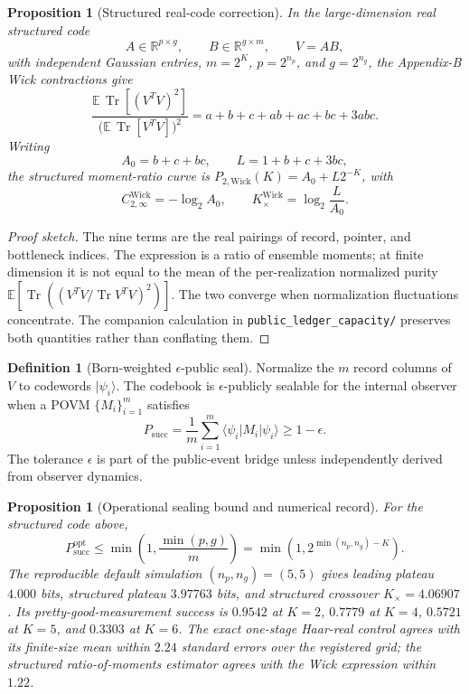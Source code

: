 \documentclass[11pt]{article}
\theoremstyle{plain}
\newtheorem{proposition}[theorem]{Proposition}
\theoremstyle{definition}
\newtheorem{definition}[theorem]{Definition}
\theoremstyle{remark}
\newenvironment{proofsketch}{\begin{proof}[Proof sketch]}{\end{proof}}
\newcommand{\R}{\mathbb{R}}
\newcommand{\Tr}{\operatorname{Tr}}
\begin{document}
\begin{proposition}[Structured real-code correction]
In the large-dimension real structured code
\[
A\in\R^{p\times g},
\qquad
B\in\R^{g\times m},
\qquad
V=AB,
\]
with independent Gaussian entries, \(m=2^K\), \(p=2^{n_p}\), and \(g=2^{n_g}\), the Appendix-B Wick contractions give
\[
\frac{\mathbb{E}\,\Tr[(V^TV)^2]}
{\bigl(\mathbb{E}\,\Tr[V^TV]\bigr)^2}
=a+b+c+ab+ac+bc+3abc.
\]
Writing
\[
A_0=b+c+bc,
\qquad
L=1+b+c+3bc,
\]
the structured moment-ratio curve is \(P_{2,\mathrm{Wick}}(K)=A_0+L2^{-K}\), with
\[
C_{2,\infty}^{\mathrm{Wick}}=-\log_2A_0,
\qquad
K_{\times}^{\mathrm{Wick}}=\log_2\frac{L}{A_0}.
\]
\end{proposition}

\begin{proofsketch}
The nine terms are the real pairings of record, pointer, and bottleneck indices. The expression is a ratio of ensemble moments; at finite dimension it is not equal to the mean of the per-realization normalized purity \(\mathbb{E}[\Tr((V^TV/\Tr V^TV)^2)]\). The two converge when normalization fluctuations concentrate. The companion calculation in \texttt{public\_ledger\_capacity/} preserves both quantities rather than conflating them.
\end{proofsketch}

\begin{definition}[Born-weighted \(\epsilon\)-public seal]
Normalize the \(m\) record columns of \(V\) to codewords \(\lvert\psi_i\rangle\). The codebook is \(\epsilon\)-publicly sealable for the internal observer when a POVM \(\{M_i\}_{i=1}^m\) satisfies
\[
P_{\mathrm{succ}}
=\frac1m\sum_{i=1}^m
\langle\psi_i\rvert M_i\lvert\psi_i\rangle
\ge 1-\epsilon.
\]
The tolerance \(\epsilon\) is part of the public-event bridge unless independently derived from observer dynamics.
\end{definition}

\begin{proposition}[Operational sealing bound and numerical record]
For the structured code above,
\[
P_{\mathrm{succ}}^{\mathrm{opt}}
\le
\min\!\left(1,\frac{\min(p,g)}{m}\right)
=
\min\!\left(1,2^{\min(n_p,n_g)-K}\right).
\]
The reproducible default simulation \((n_p,n_g)=(5,5)\) gives leading plateau \(4.000\) bits, structured plateau \(3.97763\) bits, and structured crossover \(K_\times=4.06907\). Its pretty-good-measurement success is \(0.9542\) at \(K=2\), \(0.7779\) at \(K=4\), \(0.5721\) at \(K=5\), and \(0.3303\) at \(K=6\). The exact one-stage Haar-real control agrees with its finite-size mean within \(2.24\) standard errors over the registered grid; the structured ratio-of-moments estimator agrees with the Wick expression within \(1.22\).
\end{proposition}
\end{document}
